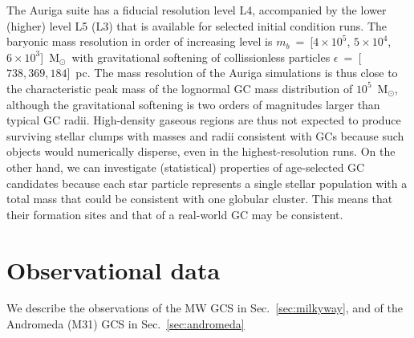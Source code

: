 \documentclass[a4paper,fleqn,usenatbib]{mnras}
\newcommand{\Sun}[0]{\ensuremath{_{\odot}}}
\begin{document}
The Auriga suite has a fiducial resolution level L4, accompanied by the lower
(higher) level L5 (L3) that is available for selected initial condition runs.
The baryonic mass resolution in order of increasing level is $m_b$~=~[$4 \times 10^5$,
$5 \times 10^4$, $6 \times 10^3$]~M\Sun \, with gravitational softening of
collissionless particles $\epsilon$~=~[$738, 369, 184$]~pc. The mass resolution
of the Auriga simulations is thus close to the characteristic peak mass of the
lognormal GC mass distribution of $10^{5}$~M\Sun \citep{1991ARA&A..29..543H},
although the gravitational softening is two orders of magnitudes larger than
typical GC radii. High-density gaseous regions are thus not expected to produce
surviving stellar clumps with masses and radii consistent with GCs because
such objects would numerically disperse, even in the highest-resolution runs.
On the other hand, we can investigate (statistical) properties of age-selected
GC candidates because each star particle represents a single stellar population
with a total mass that could be consistent with one globular cluster. This means
that their formation sites and that of a real-world GC may be consistent.

\section{Observational data}
\label{sec:observations}
We describe the observations of the MW GCS in Sec.~\ref{sec:milkyway},
and of the Andromeda (M31) GCS in Sec.~\ref{sec:andromeda}
\end{document}
